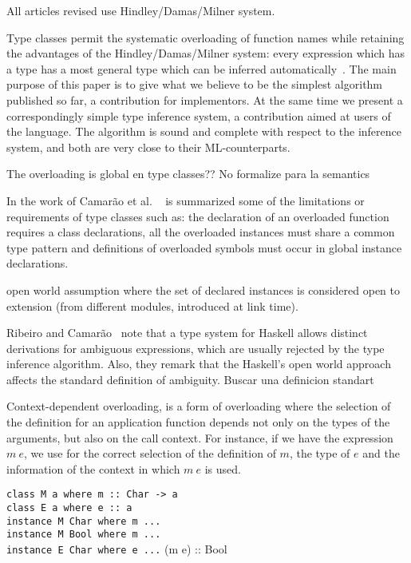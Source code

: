 \documentclass[hidelinks, twocolumn]{article}
\begin{document}
All articles revised use Hindley/Damas/Milner system.

Type classes permit the systematic overloading
of function names while retaining the advantages of the
Hindley/Damas/Milner system: every expression which
has a type has a most general type which can be inferred
automatically~\cite{Nipkow1993}. The main purpose of this paper is to give
what we believe to be the simplest algorithm published
so far, a contribution for implementors. At the same
time we present a correspondingly simple type inference
system, a contribution aimed at users of the language.
The algorithm is sound and complete with respect to
the inference system, and both are very close to their
ML-counterparts.

The overloading is global en type classes??
 No formalize para la semantics
 
In the work of Camar\~ao et al. ~\cite{Camarao1999} is summarized some of the limitations or requirements of type classes such as: the declaration of an overloaded function requires a class declarations, all the overloaded instances must share a common type pattern and definitions of overloaded symbols must occur in global instance declarations.

open world assumption where the
set of declared instances is considered open to extension (from different modules,
introduced at link time).


Ribeiro and Camar\~ao~\cite{Ribeiro2013} note that a type system for Haskell allows distinct derivations for ambiguous expressions, which are usually rejected by the type inference algorithm. Also, they remark that the Haskell's open world approach affects the standard definition of ambiguity. Buscar una definicion standart


Context-dependent overloading, is a form of overloading where the selection of the definition for an application function depends not only on the types of the arguments, but also on the call context. For instance,  if we have the  expression $m \ e$, we use for the correct selection of the definition of $m$, the type of $e$ and the information of the context in which  $m \ e$ is used.

\texttt{class M a where m :: Char -> a\\
class E a where e :: a\\
instance M Char where m ...\\
instance M Bool where m ...\\
instance E Char where e ...}
(m e) :: Bool
\end{document}
